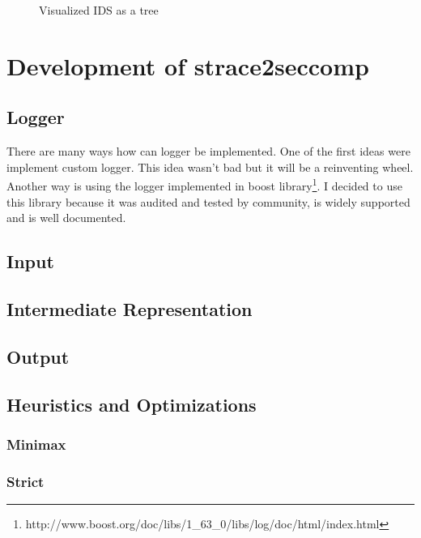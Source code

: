 \begin{figure}[h]
\centering
  \caption{Visualized IDS as a tree}
  \label{fig:tikz:IDStree}
\end{figure}

\chapter{Development of strace2seccomp}
\section{Logger}
There are many ways how can logger be implemented.
One of the first ideas were implement custom logger.
This idea wasn't bad but it will be a reinventing wheel.
Another way is using the logger implemented in boost library\footnote{http://www.boost.org/doc/libs/1\_63\_0/libs/log/doc/html/index.html}.
I decided to use this library because it was audited and tested by community, is widely supported and is well documented.
\section{Input}
\section{Intermediate Representation}
\section{Output}
\section{Heuristics and Optimizations}
\subsection{Minimax}
\subsection{Strict}
